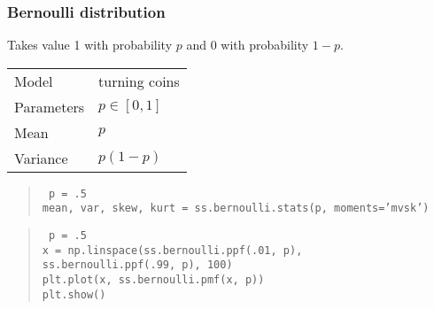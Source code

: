 \documentclass[t]{beamer}
\begin{document}
\begin{frame}
  \frametitle{Bernoulli distribution}

  Takes value 1 with probability $p$ and 0 with probability $1-p$.
  \bigskip
  
  \begin{tabular}{l|l}
    Model & turning coins\\[1mm]
    Parameters & $p\in [0,1]$\\[1mm]
    Mean & $p$\\[1mm]
    Variance & $p(1-p)$
  \end{tabular}

  \vspace{6mm}
   {
    \begin{quote}
      \tt
      p = .5\\
      mean, var, skew, kurt = ss.bernoulli.stats(p, moments='mvsk')
    \end{quote}
  }
   {
    \begin{quote}
      \tt
      p = .5\\
      x = np.linspace(ss.bernoulli.ppf(.01, p), \\
      \hspace{1cm}ss.bernoulli.ppf(.99, p), 100)\\
      plt.plot(x, ss.bernoulli.pmf(x, p))\\
      plt.show()
    \end{quote}

  }

  
  
\end{frame}
\end{document}
